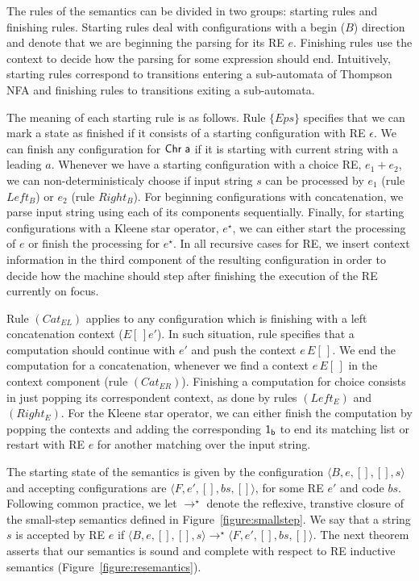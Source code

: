 \documentclass[sigplan]{acmart}
\theoremstyle{definition}
\newcommand{\C}[1]{\red{\mathsf{#1}}}
\newcommand{\V}[1]{\black{\mathsf{#1}}}
\newcommand{\conf}[1]{\ensuremath{\langle #1 \rangle}}
\begin{document}
The rules of the semantics can be divided in two groups: starting rules and finishing rules.
Starting rules deal with configurations with a begin ($B$) direction and denote that we are
beginning the parsing for its RE $e$. Finishing rules use the context to decide how the parsing
for some expression should end. Intuitively, starting rules correspond to transitions entering a
sub-automata of Thompson NFA and finishing rules to transitions exiting a sub-automata.

The meaning of each starting rule is as follows. Rule $\{Eps\}$ specifies that we can mark a state as
finished if it consists of a starting configuration with RE $\epsilon$. We can finish any configuration
for \ensuremath{\C{Chr}\;\V{a}} if it is starting with current string with a leading $a$. Whenever we have a starting configuration
with a choice RE, $e_1 + e_2$, we can non-deterministicaly choose if input string $s$ can be processed by
$e_1$ (rule $Left_B$) or $e_2$ (rule $Right_B$). For beginning configurations with concatenation, we parse
input string using each of its components sequentially. Finally, for starting configurations with a Kleene
star operator, $e^\star$, we can either start the processing of $e$ or finish the processing for $e^\star$.
In all recursive cases for RE, we insert context information in the third component of the resulting
configuration in order to decide how the machine should step after finishing the execution of the RE
currently on focus.

Rule $(Cat_{EL})$ applies to any configuration which is finishing with a left concatenation context ($E[\,]e'$).
In such situation, rule specifies that a computation should continue with $e'$ and push the context $e\,E[\,]$.
We end the computation for a concatenation, whenever we find a context $e\,E[\,]$ in the context component
(rule $(Cat_{ER})$). Finishing a computation for choice consists in just popping its correspondent context,
as done by rules $(Left_E)$ and $(Right_E)$. For the Kleene star operator, we can either finish the computation
by popping the contexts and adding the corresponding \ensuremath{\C{1_b}} to end its matching list or restart with RE $e$ for
another matching over the input string.

The starting state of the semantics is given by the configuration
$\conf{B,e,[],[],s}$ and accepting configurations are $\conf{F,e',[],bs,[]}$, for some RE $e'$ and code $bs$.
Following common practice, we let $\to^\star$ denote the reflexive, transtive closure of the small-step
semantics defined in Figure~\ref{figure:smallstep}.
We say that a string $s$ is accepted by RE $e$ if $\conf{B,e,[],[],s}\to^\star\conf{F,e',[],bs,[]}$.
The next theorem asserts that our semantics is sound and complete with respect to RE
inductive semantics (Figure~\ref{figure:resemantics}).
\end{document}
